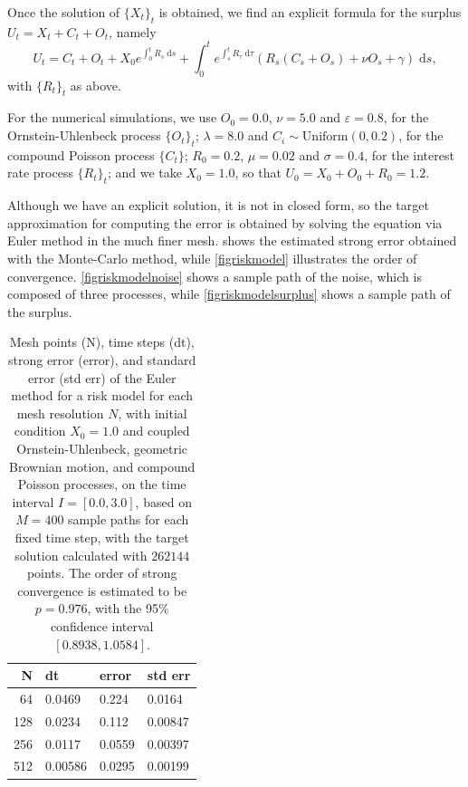 \documentclass[reqno,12pt]{amsart}
\theoremstyle{plain} %
\theoremstyle{definition} %
\begin{document}
Once the solution of $\{X_t\}_t$ is obtained, we find an explicit formula for the surplus $U_t = X_t + C_t + O_t$, namely
\[
  U_t = C_t + O_t + X_0 e^{\int_0^t R_s\;\mathrm{d}s} + \int_0^t e^{\int_s^t R_\tau\;\mathrm{d}\tau} (R_s (C_s + O_s) + \nu O_s + \gamma)\;\mathrm{d}s,
\]
with $\{R_t\}_t$ as above.

For the numerical simulations, we use $O_0 = 0.0$, $\nu = 5.0$ and $\varepsilon = 0.8$, for the Ornstein-Uhlenbeck process $\{O_t\}_t$; $\lambda = 8.0$ and $C_i \sim \mathrm{Uniform}(0, 0.2)$, for the compound Poisson process $\{C_t\}$; $R_0 = 0.2$, $\mu = 0.02$ and $\sigma = 0.4$, for the interest rate process $\{R_t\}_t$; and we take $X_0 = 1.0$, so that $U_0 = X_0 + O_0 + R_0 = 1.2$.

Although we have an explicit solution, it is not in closed form, so the target approximation for computing the error is obtained by solving the equation via Euler method in the much finer mesh.  shows the estimated strong error obtained with the Monte-Carlo method, while \cref{figriskmodel} illustrates the order of convergence. \cref{figriskmodelnoise} shows a sample path of the noise, which is composed of three processes, while \cref{figriskmodelsurplus} shows a sample path of the surplus.

\begin{table}
    \begin{center}
        \begin{tabular}[htb]{|r|l|l|l|}
            \hline N & dt & error & std err \\
            \hline \hline
            64 & 0.0469 & 0.224 & 0.0164 \\
            128 & 0.0234 & 0.112 & 0.00847 \\
            256 & 0.0117 & 0.0559 & 0.00397 \\
            512 & 0.00586 & 0.0295 & 0.00199 \\
            \hline
        \end{tabular}
    \end{center}

    \bigskip

    \caption{Mesh points (N), time steps (dt), strong error (error), and standard error (std err) of the Euler method for a risk model for each mesh resolution $N$, with initial condition $X_0 = 1.0$ and coupled Ornstein-Uhlenbeck, geometric Brownian motion, and compound Poisson processes, on the time interval $I = [0.0, 3.0]$, based on $M = 400$ sample paths for each fixed time step, with the target solution calculated with $262144$ points. The order of strong convergence is estimated to be $p = 0.976$, with the 95\% confidence interval $[0.8938, 1.0584]$.}

    \label{tableriskmodel}
\end{table}
\end{document}
